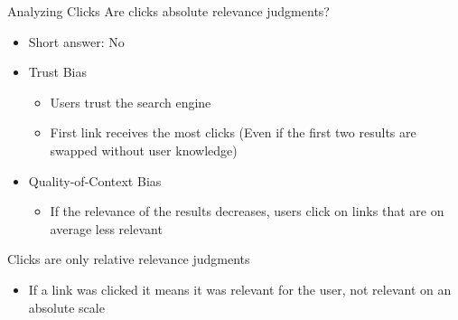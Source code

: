 
\begin{frame}{Analyzing Clicks}
  Are clicks absolute relevance judgments?
  \begin{itemize}
  \item Short answer: No
  \item Trust Bias
    \begin{itemize}
    \item Users trust the search engine
    \item First link receives the most clicks
      (Even if the first two results are swapped without user knowledge)
    \end{itemize}
  \item Quality-of-Context Bias
    \begin{itemize}
    \item If the relevance of the results decreases, users click on links
      that are on average less relevant
    \end{itemize}
  \end{itemize}
  Clicks are only relative relevance judgments
  \begin{itemize}
  \item If a link was clicked it means it was relevant for the user,
    not relevant on an absolute scale
  \end{itemize}
\end{frame}

